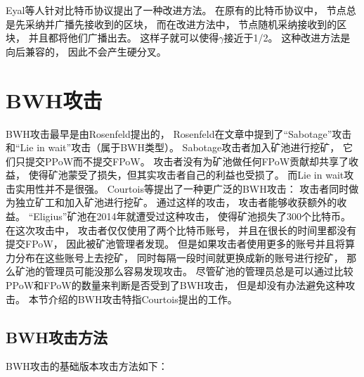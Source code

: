 \documentclass[a4paper, 11pt]{article}
\begin{document}
\begin{CJK*}{UTF8}{gbsn}
    Eyal等人针对比特币协议提出了一种改进方法。
    在原有的比特币协议中，
    节点总是先采纳并广播先接收到的区块，
    而在改进方法中，
    节点随机采纳接收到的区块，
    并且都将他们广播出去。
    这样子就可以使得$\gamma$接近于1/2。
    这种改进方法是向后兼容的，
    因此不会产生硬分叉。

    \section{BWH攻击}

    \indent

    BWH攻击最早是由Rosenfeld\cite{ref_BWH1}提出的，
    Rosenfeld在文章中提到了“Sabotage”攻击和“Lie in wait”攻击（属于BWH类型）。
    Sabotage攻击者加入矿池进行挖矿，
    它们只提交PPoW而不提交FPoW。
    攻击者没有为矿池做任何FPoW贡献却共享了收益，
    使得矿池蒙受了损失，但其实攻击者自己的利益也受损了。
    而Lie in wait攻击实用性并不是很强。
    Courtois\cite{ref_BWH2}等提出了一种更广泛的BWH攻击：
    攻击者同时做为独立矿工和加入矿池进行挖矿。
    通过这样的攻击，
    攻击者能够收获额外的收益。
    “Eligius”矿池在2014年就遭受过这种攻击，
    使得矿池损失了300个比特币\cite{ref_web5}。
    在这次攻击中，
    攻击者仅仅使用了两个比特币账号，
    并且在很长的时间里都没有提交FPoW，
    因此被矿池管理者发现。
    但是如果攻击者使用更多的账号并且将算力分布在这些账号上去挖矿，
    同时每隔一段时间就更换成新的账号进行挖矿，
    那么矿池的管理员可能没那么容易发现攻击。
    尽管矿池的管理员总是可以通过比较PPoW和FPoW的数量来判断是否受到了BWH攻击，
    但是却没有办法避免这种攻击。
    本节介绍的BWH攻击特指Courtois提出的工作\cite{ref_BWH2}。

    \subsection{BWH攻击方法}

    \indent

    BWH攻击的基础版本攻击方法如下：


\end{CJK*}
\end{document}

